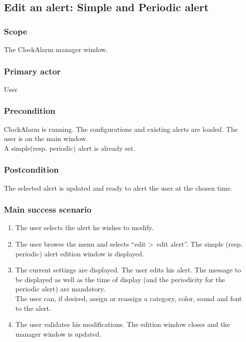 \subsection{Edit an alert: Simple and Periodic alert}

\subsubsection{Scope}
The ClockAlarm manager window.
\subsubsection{Primary actor}
User
\subsubsection{Precondition}
ClockAlarm is running. The configurations and existing alerts are loaded. The user is on the main window.
\\A simple(resp. periodic) alert is already set.
\subsubsection{Postcondition}
The selected alert is updated and ready to alert the user at the chosen time.
\subsubsection{Main success scenario}
\begin{enumerate}
	\item The user selects the alert he wishes to modify.
	\item \label{itm:ucae_edit_spa} The user browse the menu and selects ``edit \textgreater~edit alert''. The simple (resp. periodic) alert edition window is displayed. 
	\item \label{itm:ucae_enter_spa} The current settings are displayed. The user edits his alert. The message to be displayed as well as the time of display (and the periodicity for the periodic alert) are mandatory. \\The user can, if desired, assign or reassign a category, color, sound and font to the alert.
	\item \label{itm:ucae_validate_spa} The user validates his modifications. The edition window closes and the manager window is updated.
\end{enumerate}
